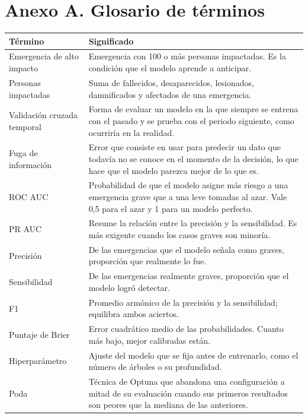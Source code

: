 \documentclass[12pt,a4paper]{article}
\begin{document}
\section*{Anexo A. Glosario de términos}

\begin{table}[H]\centering\small
\begin{tabularx}{\textwidth}{L{3.6cm}Y}
\toprule
Término & Significado \\
\midrule
Emergencia de alto impacto & Emergencia con 100 o más personas impactadas. Es la condición que el modelo aprende a anticipar. \\
Personas impactadas & Suma de fallecidos, desaparecidos, lesionados, damnificados y afectados de una emergencia. \\
Validación cruzada temporal & Forma de evaluar un modelo en la que siempre se entrena con el pasado y se prueba con el
periodo siguiente, como ocurriría en la realidad. \\
Fuga de información & Error que consiste en usar para predecir un dato que todavía no se conoce en el momento de la
decisión, lo que hace que el modelo parezca mejor de lo que es. \\
ROC AUC & Probabilidad de que el modelo asigne más riesgo a una emergencia grave que a una leve tomadas al azar.
Vale 0,5 para el azar y 1 para un modelo perfecto. \\
PR AUC & Resume la relación entre la precisión y la sensibilidad. Es más exigente cuando los casos graves son minoría. \\
Precisión & De las emergencias que el modelo señala como graves, proporción que realmente lo fue. \\
Sensibilidad & De las emergencias realmente graves, proporción que el modelo logró detectar. \\
F1 & Promedio armónico de la precisión y la sensibilidad; equilibra ambos aciertos. \\
Puntaje de Brier & Error cuadrático medio de las probabilidades. Cuanto más bajo, mejor calibradas están. \\
Hiperparámetro & Ajuste del modelo que se fija antes de entrenarlo, como el número de árboles o su profundidad. \\
Poda & Técnica de Optuna que abandona una configuración a mitad de su evaluación cuando sus primeros resultados son
peores que la mediana de las anteriores. \\

\end{tabularx}
\end{table}
\end{document}
